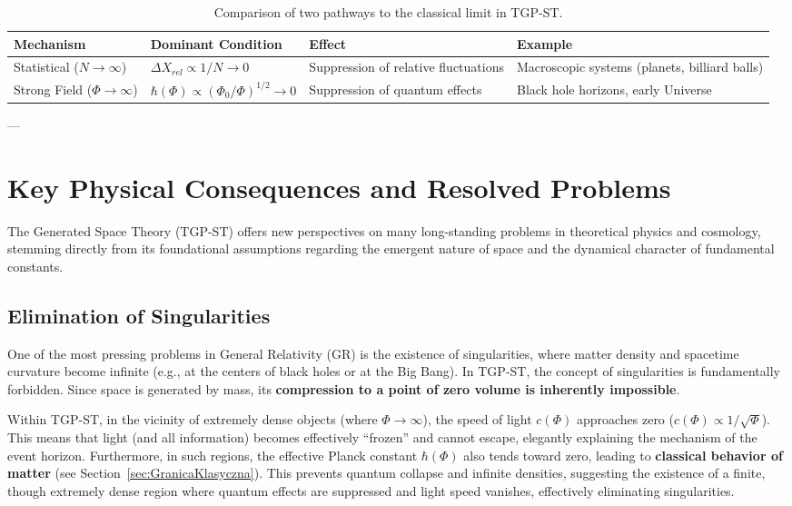 \documentclass[11pt,a4paper]{article}
\begin{document}
\begin{table}[h!]
    \centering
    \small 
    \setlength{\tabcolsep}{3.5pt}
    \begin{tabular}{|>{\centering\arraybackslash}p{2.5cm}|p{4.2cm}|p{4.2cm}|p{3.8cm}|}
        \hline
        \textbf{Mechanism} & \textbf{Dominant Condition} & \textbf{Effect} & \textbf{Example} \\
        \hline
        Statistical ($N \rightarrow \infty$) & $\Delta X_{rel} \propto 1/N \rightarrow 0$ & Suppression of relative fluctuations & Macroscopic systems (planets, billiard balls) \\
        \hline
        Strong Field ($\Phi \rightarrow \infty$) & $\hbar(\Phi) \propto (\Phi_0/\Phi)^{1/2} \rightarrow 0$ & Suppression of quantum effects & Black hole horizons, early Universe \\
        \hline
    \end{tabular}
    \caption{Comparison of two pathways to the classical limit in TGP-ST.}
    \label{tab:ClassicalLimits}
\end{table}

---

\section{Key Physical Consequences and Resolved Problems}
\label{sec:Konsekwencje}

The Generated Space Theory (TGP-ST) offers new perspectives on many long-standing problems in theoretical physics and cosmology, stemming directly from its foundational assumptions regarding the emergent nature of space and the dynamical character of fundamental constants.

\subsection{Elimination of Singularities}
One of the most pressing problems in General Relativity (GR) is the existence of singularities, where matter density and spacetime curvature become infinite (e.g., at the centers of black holes or at the Big Bang). In TGP-ST, the concept of singularities is fundamentally forbidden. Since space is generated by mass, its \textbf{compression to a point of zero volume is inherently impossible}.

Within TGP-ST, in the vicinity of extremely dense objects (where $\Phi \rightarrow \infty$), the speed of light $c(\Phi)$ approaches zero ($c(\Phi) \propto 1/\sqrt{\Phi}$). This means that light (and all information) becomes effectively “frozen” and cannot escape, elegantly explaining the mechanism of the event horizon. Furthermore, in such regions, the effective Planck constant $\hbar(\Phi)$ also tends toward zero, leading to \textbf{classical behavior of matter} (see Section~\ref{sec:GranicaKlasyczna}). This prevents quantum collapse and infinite densities, suggesting the existence of a finite, though extremely dense region where quantum effects are suppressed and light speed vanishes, effectively eliminating singularities.
\end{document}
